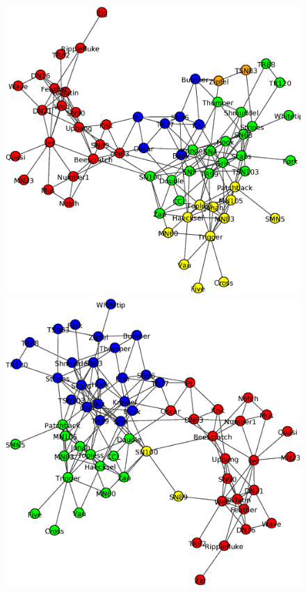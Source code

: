 \begin{figure}
\centering
\includegraphics[scale = 0.2]{figuras/Edge_betweenness}
\includegraphics[scale = 0.2]{figuras/Fast_greedy} \\

\end{figure}
